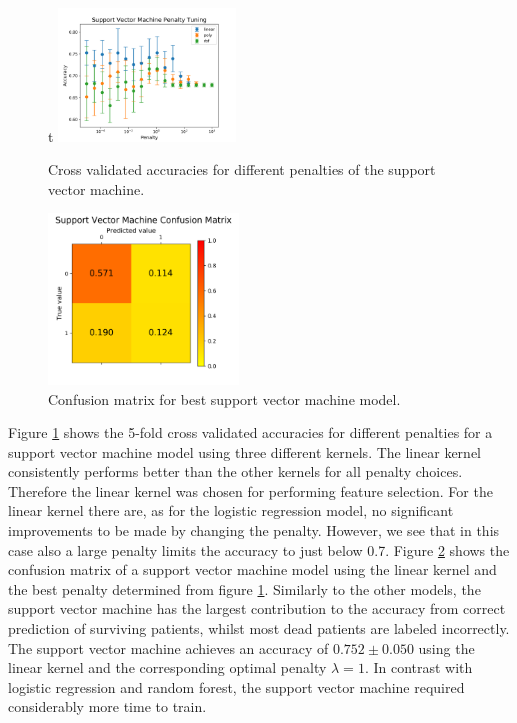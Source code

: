 \documentclass[notitlepage, reprint, nofootinbib]{revtex4-1}
\begin{document}
\begin{figure}[h!]t
	\centering
	\includegraphics[width=0.42\textwidth]{../Figures/SVM_penalty_tuning.png}
	\caption{Cross validated accuracies for different penalties of the support vector machine.}
	\label{CV_SVM}
\end{figure}
\clearpage
\begin{figure}[h!]
	\centering
	\includegraphics[width=0.45\textwidth]{../Figures/CM_SVM.png}
	\caption{Confusion matrix for best support vector machine model.}
	\label{CM_SVM}
\end{figure}

Figure \ref{CV_SVM} shows the 5-fold cross validated accuracies for different penalties for a support vector machine model using three different kernels. The linear kernel consistently performs better than the other kernels for all penalty choices. Therefore the linear kernel was chosen for performing feature selection. For the linear kernel there are, as for the logistic regression model, no significant improvements to be made by changing the penalty. However, we see that in this case also a large penalty limits the accuracy to just below 0.7. Figure \ref{CM_SVM} shows the confusion matrix of a support vector machine model using the linear kernel and the best penalty determined from figure \ref{CV_SVM}. Similarly to the other models, the support vector machine has the largest contribution to the accuracy from correct prediction of surviving patients, whilst most dead patients are labeled incorrectly.  The support vector machine achieves an accuracy of $0.752\pm0.050$ using the linear kernel and the corresponding optimal penalty $\lambda=1$. In contrast with logistic regression and random forest, the support vector machine required considerably more time to train.
\end{document}
